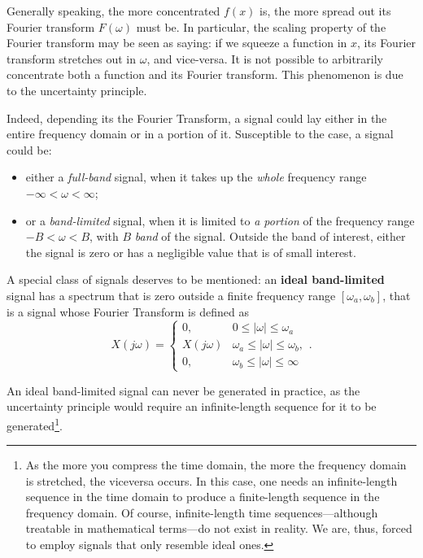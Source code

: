 \documentclass[\documentfontsize, twocolumn]{\classname}
\begin{document}
Generally speaking, the more concentrated $f(x)$ is, the more spread out its Fourier transform $F(\omega)$ must be. In particular, the scaling property of the Fourier transform may be seen as saying: if we squeeze a function in $x$, its Fourier transform stretches out in $\omega$, and vice-versa. It is not possible to arbitrarily concentrate both a function and its Fourier transform. This phenomenon is due to the uncertainty principle.

Indeed, depending its the Fourier Transform, a signal could lay either in the entire frequency domain or in a portion of it. Susceptible to the case, a signal could be:
\begin{itemize}
    \item either a \emph{full-band} signal, when it takes up the \emph{whole} frequency range $-\infty < \omega < \infty$;
    \item or a \emph{band-limited} signal, when it is limited to \emph{a
    	    portion} of the frequency range $-B < \omega < B$, with $B$
    	    	\emph{band} of the signal. Outside the band of interest, either
    	    	the signal is zero or has a negligible value that is of small
    	    	interest.
\end{itemize}

A special class of signals deserves to be mentioned: an \textbf{ideal band-limited} signal has a spectrum that is zero outside a finite frequency range $[\omega_a, \omega_b]$, that is a signal whose Fourier Transform is defined as
\begin{equation}\label{eqn:idealBandSignal}
    X(j\omega) = \left\{\begin{array}{ll}
        0,  &   0 \leq |\omega| \leq \omega_a\\
        X(j\omega)  &   \omega_a \leq |\omega| \leq \omega_b,\\
        0,  &   \omega_b \leq |\omega| \leq \infty
    \end{array}\right..
\end{equation}

An ideal band-limited signal can never be generated in practice, as the
uncertainty principle would require an infinite-length sequence for it to be
generated\footnote{As the more you compress the time domain, the more the
frequency domain is stretched, the viceversa occurs. In this case, one needs
an infinite-length sequence in the time domain to produce a finite-length
sequence in the frequency domain. Of course, infinite-length time
sequences---although treatable in mathematical terms---do not exist in
reality. We are, thus, forced to employ signals that only resemble ideal
ones.}.
\end{document}
